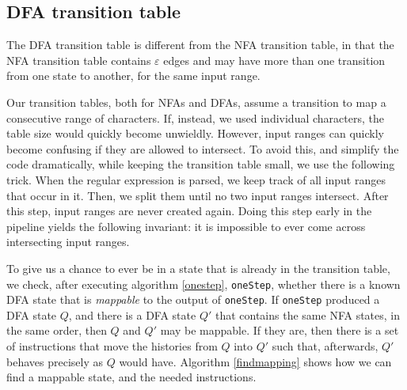 \documentclass[english]{sigplanconf}
\theoremstyle{definition}
\begin{document}
\subsection{DFA transition table}
The DFA transition table is different from the NFA transition table,
in that the NFA transition table contains $\varepsilon$ edges and
may have more than one transition from one state to another, for
the same input range.

Our transition tables, both for NFAs and DFAs, assume a transition
to map a consecutive range of characters. If, instead, we used
individual characters, the table size would quickly become unwieldly.
However, input ranges can quickly become confusing if they are
allowed to intersect. To avoid this, and simplify the code dramatically,
while keeping the transition table small, we use the following
trick. When the regular expression is parsed, we keep track of all
input ranges that occur in it. Then, we split them until no two
input ranges intersect.  After this step, input ranges are never
created again.  Doing this step early in the pipeline yields the
following invariant: it is impossible to ever come across intersecting
input ranges.

To give us a chance to ever be in a state that is already in the transition table, we 
check, after executing algorithm \ref{onestep}, \texttt{oneStep}, whether there is a known
DFA state that is \emph{mappable} to the output of \texttt{oneStep}.
If \texttt{oneStep} produced a DFA state $Q$, and there is a DFA state $Q'$ that
contains the same NFA states, in the same order, then $Q$ and $Q'$ may be mappable.
If they are, then there is a set of instructions that move the histories from $Q$ into $Q'$
such that, afterwards, $Q'$ behaves precisely as $Q$ would have. Algorithm \ref{findmapping}
shows how we can find a mappable state, and the needed instructions.
\end{document}
